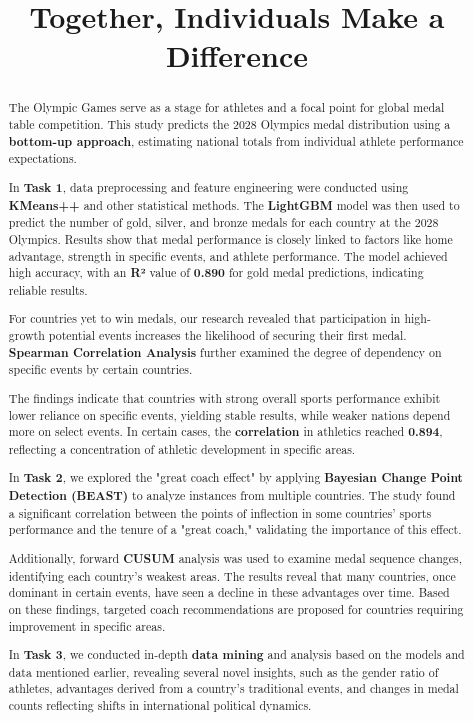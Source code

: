 \documentclass[12pt]{article}  %
\title{Together, Individuals Make a Difference}  %
\begin{document}
\begin{abstract}
	The Olympic Games serve as a stage for athletes and a focal point for global medal table competition. This study predicts the 2028 Olympics medal distribution using a \textbf{bottom-up approach}, estimating national totals from individual athlete performance expectations.
	
	In \textbf{Task 1}, data preprocessing and feature engineering were conducted using \textbf{KMeans++} and other statistical methods. The \textbf{LightGBM} model was then used to predict the number of gold, silver, and bronze medals for each country at the 2028 Olympics. Results show that medal performance is closely linked to factors like home advantage, strength in specific events, and athlete performance. The model achieved high accuracy, with an \textbf{R²} value of \textbf{0.890} for gold medal predictions, indicating reliable results.
	
	For countries yet to win medals, our research revealed that participation in high-growth potential events increases the likelihood of securing their first medal. \textbf{Spearman Correlation Analysis} further examined the degree of dependency on specific events by certain countries.
	
	The findings indicate that countries with strong overall sports performance exhibit lower reliance on specific events, yielding stable results, while weaker nations depend more on select events. In certain cases, the \textbf{correlation} in athletics reached \textbf{0.894}, reflecting a concentration of athletic development in specific areas.
	
	In \textbf{Task 2}, we explored the "great coach effect" by applying \textbf{Bayesian Change Point Detection (BEAST)} to analyze instances from multiple countries. The study found a significant correlation between the points of inflection in some countries' sports performance and the tenure of a "great coach," validating the importance of this effect.
	
	Additionally, forward \textbf{CUSUM} analysis was used to examine medal sequence changes, identifying each country's weakest areas. The results reveal that many countries, once dominant in certain events, have seen a decline in these advantages over time. Based on these findings, targeted coach recommendations are proposed for countries requiring improvement in specific areas.
	
	In \textbf{Task 3}, we conducted in-depth \textbf{data mining} and analysis based on the models and data mentioned earlier, revealing several novel insights, such as the gender ratio of athletes, advantages derived from a country's traditional events, and changes in medal counts reflecting shifts in international political dynamics.
	

\end{abstract}
\end{document}
